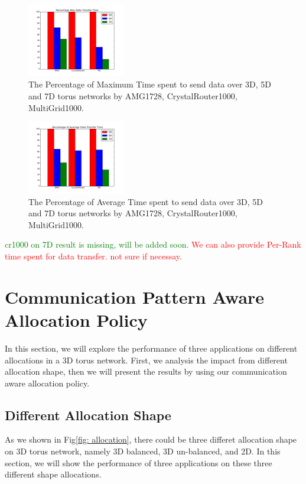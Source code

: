 \documentclass[conference]{IEEEtran}
\begin{document}
\begin{figure}[h!] 
  \centering
  \includegraphics[width=0.38\textwidth]{figs/dimenstudy/maxtime}
   \caption{The Percentage of Maximum Time spent to send data over 3D, 5D and 7D torus networks by AMG1728, CrystalRouter1000, MultiGrid1000.}
   \label{fig: dimenstudy-maxtime}
\end{figure}

\begin{figure}[h!] 
  \centering
  \includegraphics[width=0.38\textwidth]{figs/dimenstudy/avgtime}
   \caption{The Percentage of Average Time spent to send data over 3D, 5D and 7D torus networks by AMG1728, CrystalRouter1000, MultiGrid1000.}
   \label{fig: dimenstudy-avgtime}
\end{figure}

\textcolor{green}{cr1000 on 7D result is missing, will be added soon.}
\textcolor{red}{We can also provide Per-Rank time spent for data transfer. not sure if necessay.}


\section{Communication Pattern Aware Allocation Policy }
In this section, we will explore the performance of three applications on different allocations in a 3D torus network. First, we analysis the impact from different allocation shape, then we will present the results by using our communication aware allocation policy.  

\subsection{Different Allocation Shape}
As we shown in Fig\ref{fig: allocation}, there could be three differet allocation shape on 3D torus network, namely 3D balanced, 3D un-balanced, and 2D. In this section, we will show the performance of three applications on these three different shape allocations.
\end{document}
